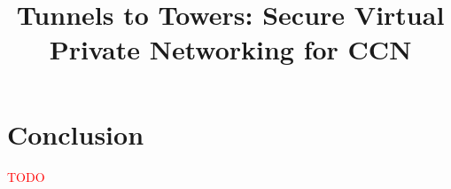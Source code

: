 \documentclass[conference,letterpaper,10pt]{IEEEtran}
\newcommand\todo[1]{\textcolor{red}{#1}}
\begin{document}
\title{Tunnels to Towers: Secure Virtual Private Networking for CCN}


\maketitle


\begin{abstract}

\end{abstract}

\begin{IEEEkeywords}
\end{IEEEkeywords}

\IEEEpeerreviewmaketitle








%

\section{Conclusion}\label{conclusion}
\todo{TODO}

\ifCLASSOPTIONcaptionsoff
  \newpage
\fi

\tiny




\end{document}

